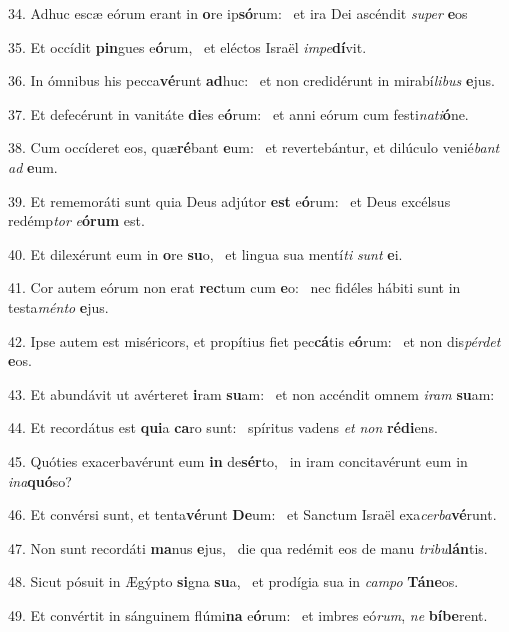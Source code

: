 34. Adhuc escæ eórum erant in \textbf{o}re ip\textbf{só}rum: \ast\  et ira Dei ascéndit \textit{su}\textit{per} \textbf{e}os\

35. Et occídit \textbf{pin}gues e\textbf{ó}rum, \ast\  et eléctos Israël \textit{im}\textit{pe}\textbf{dí}vit.\

36. In ómnibus his pecca\textbf{vé}runt \textbf{ad}huc: \ast\  et non credidérunt in mirabí\textit{li}\textit{bus} \textbf{e}jus.\

37. Et defecérunt in vanitáte \textbf{di}es e\textbf{ó}rum: \ast\  et anni eórum cum festi\textit{na}\textit{ti}\textbf{ó}ne.\

38. Cum occíderet eos, quæ\textbf{ré}bant \textbf{e}um: \ast\  et revertebántur, et dilúculo venié\textit{bant} \textit{ad} \textbf{e}um.\

39. Et rememoráti sunt quia Deus adjútor \textbf{est} e\textbf{ó}rum: \ast\  et Deus excélsus redémp\textit{tor} \textit{e}\textbf{ó}\textbf{rum} est.\

40. Et dilexérunt eum in \textbf{o}re \textbf{su}o, \ast\  et lingua sua mentí\textit{ti} \textit{sunt} \textbf{e}i.\

41. Cor autem eórum non erat \textbf{rec}tum cum \textbf{e}o: \ast\  nec fidéles hábiti sunt in testa\textit{mén}\textit{to} \textbf{e}jus.\

42. Ipse autem est miséricors, et propítius fiet pec\textbf{cá}tis e\textbf{ó}rum: \ast\  et non dis\textit{pér}\textit{det} \textbf{e}os.\

43. Et abundávit ut avérteret \textbf{i}ram \textbf{su}am: \ast\  et non accéndit omnem \textit{i}\textit{ram} \textbf{su}am:\

44. Et recordátus est \textbf{qui}a \textbf{ca}ro sunt: \ast\  spíritus vadens \textit{et} \textit{non} \textbf{réd}\textbf{i}ens.\

45. Quóties exacerbavérunt eum \textbf{in} de\textbf{sér}to, \ast\  in iram concitavérunt eum in \textit{in}\textit{a}\textbf{quó}so?\

46. Et convérsi sunt, et tenta\textbf{vé}runt \textbf{De}um: \ast\  et Sanctum Israël exa\textit{cer}\textit{ba}\textbf{vé}runt.\

47. Non sunt recordáti \textbf{ma}nus \textbf{e}jus, \ast\  die qua redémit eos de manu \textit{tri}\textit{bu}\textbf{lán}tis.\

48. Sicut pósuit in Ægýpto \textbf{si}gna \textbf{su}a, \ast\  et prodígia sua in \textit{cam}\textit{po} \textbf{Tá}\textbf{ne}os.\

49. Et convértit in sánguinem flúmi\textbf{na} e\textbf{ó}rum: \ast\  et imbres eó\textit{rum}, \textit{ne} \textbf{bí}\textbf{be}rent.\

